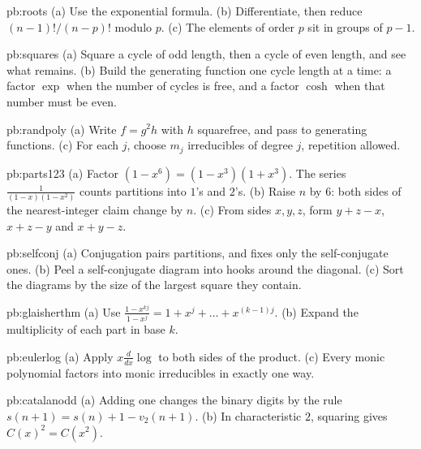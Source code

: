 \begin{hint}{pb:roots}
(a) Use the exponential formula. (b) Differentiate, then reduce $(n-1)!/(n-p)!$ modulo $p$. (c) The elements of order $p$ sit in groups
of $p-1$.
\end{hint}

\begin{hint}{pb:squares}
(a) Square a cycle of odd length, then a cycle of even length, and see what remains. (b) Build the generating function one cycle length at a time:
a factor $\exp$ when the number of cycles is free, and a factor $\cosh$ when that number must be even.
\end{hint}

\begin{hint}{pb:randpoly}
(a) Write $f=g^2h$ with $h$ squarefree, and pass to generating functions. (c) For each $j$, choose $m_j$ irreducibles of degree $j$, repetition allowed.
\end{hint}

\begin{hint}{pb:parts123}
(a) Factor $(1-x^6)=(1-x^3)(1+x^3)$. The series $\frac1{(1-x)(1-x^2)}$ counts partitions into $1$'s and $2$'s. (b) Raise $n$ by $6$: both sides of the nearest-integer claim change by $n$. (c) From sides $x,y,z$, form $y+z-x$, $x+z-y$ and $x+y-z$.
\end{hint}

\begin{hint}{pb:selfconj}
(a) Conjugation pairs partitions, and fixes only the self-conjugate ones. (b) Peel a self-conjugate diagram into hooks around the diagonal. (c) Sort the diagrams by the size of
the largest square they contain.
\end{hint}

\begin{hint}{pb:glaisherthm}
(a) Use $\frac{1-x^{kj}}{1-x^j}=1+x^j+\dots+x^{(k-1)j}$. (b) Expand the multiplicity of each part in base $k$.
\end{hint}

\begin{hint}{pb:eulerlog}
(a) Apply $x\frac d{dx}\log$ to both sides of the product. (c) Every monic polynomial factors into monic irreducibles in exactly one way.
\end{hint}

\begin{hint}{pb:catalanodd}
(a) Adding one changes the binary digits by the rule $s(n+1)=s(n)+1-v_2(n+1)$. (b) In characteristic $2$, squaring gives $C(x)^2=C(x^2)$.
\end{hint}

